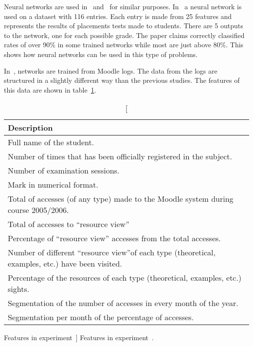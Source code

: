 Neural networks are used in~\cite{ind_003} and~\cite{ind_006} for similar
purposes. In~\cite{ind_003} a neural network is used on a dataset with 116
entries. Each entry is made from 25 features and represents the results of
placements tests made to students. There are 5 outputs to the network, one for
each possible grade. The paper claims correctly classified rates of over 90\%
in some trained networks while most are just above 80\%. This shows how neural
networks can be used in this type of problems.

In~\cite{ind_006}, networks are trained from Moodle logs. The data from the
logs are structured in a slightly different way than the previous studies. The
features of this data are shown in table~\ref{tab:ind_006_fields}.

\begin{table}[h!]
    \centering

    \begin{tabular}{l}
        Description \\ \hline
        Full name of the student. \\
        Number of times that has been officially registered in the subject. \\
        Number of examination sessions. \\
        Mark in numerical format. \\
        Total of accesses (of any type) made to the Moodle system during course 2005/2006. \\
        Total of accesses to “resource view” \\
        Percentage of “resource view” accesses from the total accesses. \\
        Number of different “resource view”of each type (theoretical, examples, etc.) have been visited. \\
        Percentage of the resources of each type (theoretical, examples, etc.) sights. \\
        Segmentation of the number of accesses in every month of the year. \\
        Segmentation per month of the percentage of accesses. \\
    \end{tabular}

    \caption
        [Features in experiment~\cite{ind_006}]
        {Features in experiment~\cite{ind_006}.}

    \label{tab:ind_006_fields}
\end{table}

